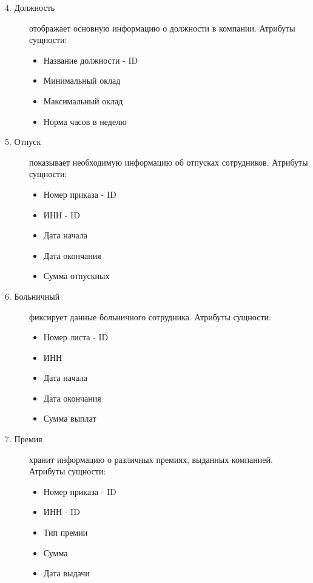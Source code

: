 \documentclass[a4paper, 14pt]{extarticle}
\begin{document}
\begin{description}
    \item[4. Должность] отображает основную информацию о должности в компании.\newline
    Атрибуты сущности:
    \vspace{-0.5em}
    \begin{itemize}
        \item Название должности - ID
        \item Минимальный оклад
        \item Максимальный оклад
        \item Норма часов в неделю
    \end{itemize}
    
    \item[5. Отпуск] показывает необходимую информацию об отпусках сотрудников.\newline
    Атрибуты сущности: 
    \vspace{-0.5em}
    \begin{itemize}
        \item Номер приказа - ID
        \item ИНН - ID
        \item Дата начала
        \item Дата окончания
        \item Сумма отпускных
    \end{itemize}
    
    \item[6. Больничный] фиксирует данные больничного сотрудника. \newline
    Атрибуты сущности:
    \vspace{-0.5em}
    \begin{itemize}
        \item Номер листа - ID
        \item ИНН
        \item Дата начала
        \item Дата окончания
        \item Сумма выплат
    \end{itemize}

    \item[7. Премия] хранит информацию о различных премиях, выданных компанией.\newline
    Атрибуты сущности:
    \vspace{-0.5em}
    \begin{itemize}
        \item Номер приказа - ID
        \item ИНН - ID
        \item Тип премии
        \item Сумма
        \item Дата выдачи
    \end{itemize}
\end{description}
\end{document}
